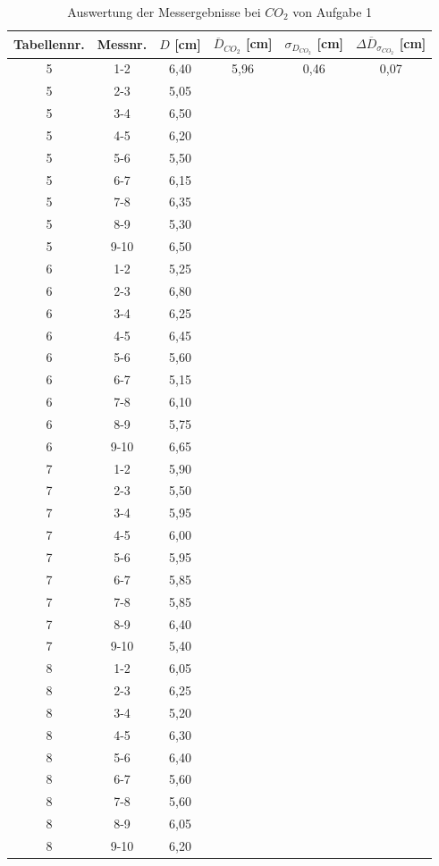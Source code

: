 \documentclass{article}
\begin{document}
\begin{table}[p]
    \centering
    \caption{Auswertung der Messergebnisse bei $CO_2$ von Aufgabe 1}
    \begin{tabular}{c|c|c|c|c|c}
        Tabellennr. & Messnr. & $D$ [cm] & $\overline{D}_{CO_2}$ [cm] & $\sigma_{D_{CO_2}}$ [cm] & $\Delta \overline{D}_{\sigma_{CO_2}}$ [cm] \\ \hline
        5 & 1-2 & 6,40 & 5,96 & 0,46 & 0,07 \\
        5 & 2-3 & 5,05 &  &  & \\
        5 & 3-4 & 6,50 &  &  & \\
        5 & 4-5 & 6,20 &  &  & \\
        5 & 5-6 & 5,50 &  &  & \\
        5 & 6-7 & 6,15 &  &  & \\
        5 & 7-8 & 6,35 &  &  & \\
        5 & 8-9 & 5,30 &  &  & \\
        5 & 9-10 & 6,50 &  &  & \\ \cline{1-3}
        6 & 1-2 & 5,25 &  &  & \\
        6 & 2-3 & 6,80 &  &  & \\
        6 & 3-4 & 6,25 &  &  & \\
        6 & 4-5 & 6,45 &  &  & \\
        6 & 5-6 & 5,60 &  &  & \\
        6 & 6-7 & 5,15 &  &  & \\
        6 & 7-8 & 6,10 &  &  & \\
        6 & 8-9 & 5,75 &  &  & \\
        6 & 9-10 & 6,65 &  &  & \\ \cline{1-3}
        7 & 1-2 & 5,90 &  &  & \\
        7 & 2-3 & 5,50 &  &  & \\
        7 & 3-4 & 5,95 &  &  & \\
        7 & 4-5 & 6,00 &  &  & \\
        7 & 5-6 & 5,95 &  &  & \\
        7 & 6-7 & 5,85 &  &  & \\
        7 & 7-8 & 5,85 &  &  & \\
        7 & 8-9 & 6,40 &  &  & \\
        7 & 9-10 & 5,40 &  &  & \\ \cline{1-3}
        8 & 1-2 & 6,05 &  &  & \\
        8 & 2-3 & 6,25 &  &  & \\
        8 & 3-4 & 5,20 &  &  & \\
        8 & 4-5 & 6,30 &  &  & \\
        8 & 5-6 & 6,40 &  &  & \\
        8 & 6-7 & 5,60 &  &  & \\
        8 & 7-8 & 5,60 &  &  & \\
        8 & 8-9 & 6,05 &  &  & \\
        8 & 9-10 & 6,20 &  &  &  
\end{tabular}
\end{table}
\end{document}
